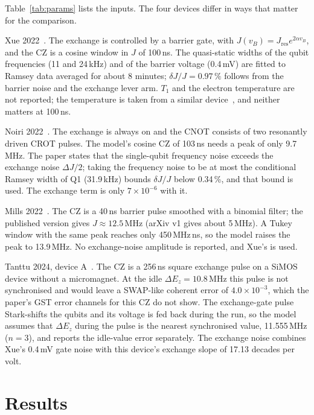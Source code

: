 \documentclass[reprint,aps,pra,floatfix,superscriptaddress,longbibliography,nofootinbib]{revtex4-2}
\newcommand{\dEz}{\Delta E_z}
\newcommand{\ee}[2]{#1\times10^{#2}}
\begin{document}
Table~\ref{tab:params} lists the inputs. The four devices differ in ways that matter for the comparison.

Xue 2022~\cite{xue2022}. The exchange is controlled by a barrier gate, with $J(v_B) = J_\mathrm{res}e^{2\alpha v_B}$, and the CZ is a cosine window in $J$ of 100\,ns. The quasi-static widths of the qubit frequencies (11 and 24\,kHz) and of the barrier voltage (0.4\,mV) are fitted to Ramsey data averaged for about 8 minutes; $\delta J/J = 0.97\,\%$ follows from the barrier noise and the exchange lever arm. $T_1$ and the electron temperature are not reported; the temperature is taken from a similar device~\cite{xue2021}, and neither matters at 100\,ns.

Noiri 2022~\cite{noiri2022}. The exchange is always on and the CNOT consists of two resonantly driven CROT pulses. The model's cosine CZ of 103\,ns needs a peak of only 9.7\,MHz. The paper states that the single-qubit frequency noise exceeds the exchange noise $\Delta J/2$; taking the frequency noise to be at most the conditional Ramsey width of Q1 (31.9\,kHz) bounds $\delta J/J$ below 0.34\,\%, and that bound is used. The exchange term is only $\ee{7}{-6}$ with it.

Mills 2022~\cite{mills2022}. The CZ is a 40\,ns barrier pulse smoothed with a binomial filter; the published version gives $J\approx12.5$\,MHz (arXiv v1 gives about 5\,MHz). A Tukey window with the same peak reaches only 450\,MHz\,ns, so the model raises the peak to 13.9\,MHz. No exchange-noise amplitude is reported, and Xue's is used.

Tanttu 2024, device A~\cite{tanttu2024}. The CZ is a 256\,ns square exchange pulse on a SiMOS device without a micromagnet. At the idle $\dEz=10.8$\,MHz this pulse is not synchronised and would leave a SWAP-like coherent error of $\ee{4.0}{-3}$, which the paper's GST error channels for this CZ do not show. The exchange-gate pulse Stark-shifts the qubits and its voltage is fed back during the run, so the model assumes that $\dEz$ during the pulse is the nearest synchronised value, 11.555\,MHz ($n=3$), and reports the idle-value error separately. The exchange noise combines Xue's 0.4\,mV gate noise with this device's exchange slope of 17.13 decades per volt.

\section{Results}
\label{sec:results}
\end{document}
